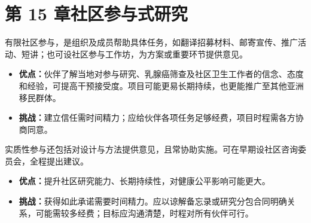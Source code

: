 \section{第 15 章\quad 社区参与式研究}
\begin{answerlist}
\item[1a.] 有限社区参与，是组织及成员帮助具体任务，如翻译招募材料、邮寄宣传、推广活动、短讲；也可设社区参与工作坊，为方案或重要环节提供意见。
\begin{itemize}
\item \textbf{优点：}伙伴了解当地对参与研究、乳腺癌筛查及社区卫生工作者的信念、态度和经验，可提高干预接受度。项目可能更易长期持续，也更能推广至其他亚洲移民群体。
\item \textbf{挑战：}建立信任需时间精力；应给伙伴各项任务足够经费，项目时程需各方协商同意。
\end{itemize}
\item[1b.] 实质性参与还包括对设计与方法提供意见，且常协助实施。可在早期设社区咨询委员会，全程提出建议。
\begin{itemize}
\item \textbf{优点：}提升社区研究能力、长期持续性，对健康公平影响可能更大。
\item \textbf{挑战：}获得如此承诺需要时间精力。应以谅解备忘录或研究分包合同明确关系，可能需较多经费；目标应沟通清楚，时程对所有伙伴可行。
\end{itemize}
\end{answerlist}

